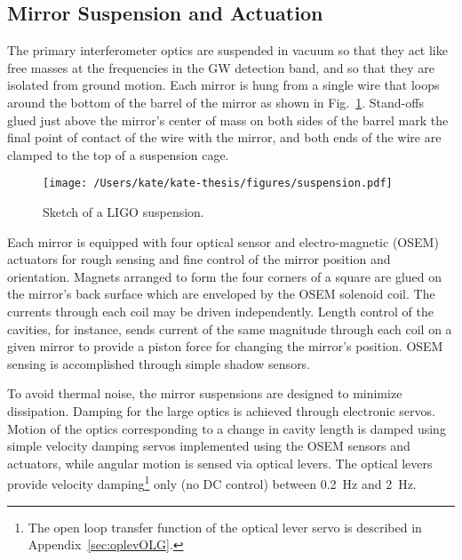



\subsection{Mirror Suspension and Actuation}
\label{sec:suspension}
The primary interferometer optics are suspended in vacuum so that they
act like free masses at the frequencies in the GW detection band, and
so that they are isolated from ground motion. Each mirror is hung from
a single wire that loops around the bottom of the barrel of the mirror
as shown in Fig.~\ref{fig:suspension}. Stand-offs glued just above the
mirror's center of mass on both sides of the barrel mark the final
point of contact of the wire with the mirror, and both ends of the
wire are clamped to the top of a suspension cage.

\begin{figure}
\begin{centering}
\texttt{[image: /Users/kate/kate-thesis/figures/suspension.pdf]}
\caption[Sketch of a LIGO suspension]{Sketch of a LIGO suspension.}
\label{fig:suspension}
\end{centering}
\end{figure}

Each mirror is equipped with four optical sensor and electro-magnetic
(OSEM) actuators for rough sensing and fine control of the mirror position and orientation. Magnets arranged
to form the four corners of a square are glued on the mirror's back
surface which are enveloped by the OSEM solenoid coil. 
The currents through each coil may be driven independently.
Length control of the
cavities, for instance, sends current of the same magnitude through
each coil on a given mirror to provide a piston force for changing the
mirror's position.  OSEM sensing is accomplished through simple shadow
sensors.

To avoid thermal noise, the mirror suspensions are designed to
minimize dissipation.  Damping for the large optics is achieved
through electronic servos.  Motion of the optics corresponding to a
change in cavity length is damped using simple velocity damping servos
implemented using the OSEM sensors and actuators, while angular motion
is sensed via optical levers.  The optical levers provide velocity
damping\footnote{ The open loop transfer function of the optical lever
  servo is described in Appendix~\ref{sec:oplevOLG}.  } only (no DC
control) between 0.2~Hz and 2~Hz.

